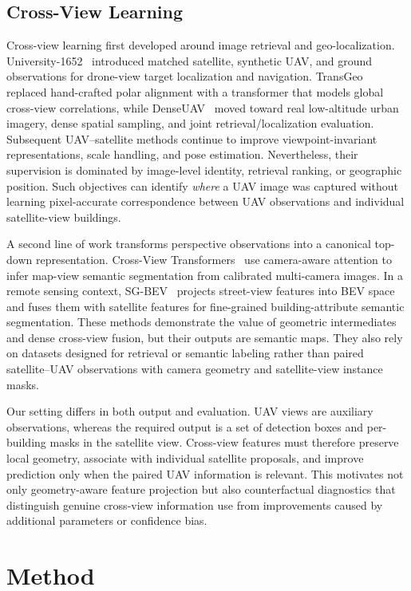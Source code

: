 \documentclass[letterpaper,journal]{IEEEtran}
\begin{document}
\subsection{Cross-View Learning}
Cross-view learning first developed around image retrieval and geo-localization. University-1652~\cite{ref_university} introduced matched satellite, synthetic UAV, and ground observations for drone-view target localization and navigation. TransGeo~\cite{ref_transgeo} replaced hand-crafted polar alignment with a transformer that models global cross-view correlations, while DenseUAV~\cite{ref_denseuav} moved toward real low-altitude urban imagery, dense spatial sampling, and joint retrieval/localization evaluation. Subsequent UAV--satellite methods continue to improve viewpoint-invariant representations, scale handling, and pose estimation. Nevertheless, their supervision is dominated by image-level identity, retrieval ranking, or geographic position. Such objectives can identify \emph{where} a UAV image was captured without learning pixel-accurate correspondence between UAV observations and individual satellite-view buildings.

A second line of work transforms perspective observations into a canonical top-down representation. Cross-View Transformers~\cite{ref_cvt} use camera-aware attention to infer map-view semantic segmentation from calibrated multi-camera images. In a remote sensing context, SG-BEV~\cite{ref_sgbeyv} projects street-view features into BEV space and fuses them with satellite features for fine-grained building-attribute semantic segmentation. These methods demonstrate the value of geometric intermediates and dense cross-view fusion, but their outputs are semantic maps. They also rely on datasets designed for retrieval or semantic labeling rather than paired satellite--UAV observations with camera geometry and satellite-view instance masks.

Our setting differs in both output and evaluation. UAV views are auxiliary observations, whereas the required output is a set of detection boxes and per-building masks in the satellite view. Cross-view features must therefore preserve local geometry, associate with individual satellite proposals, and improve prediction only when the paired UAV information is relevant. This motivates not only geometry-aware feature projection but also counterfactual diagnostics that distinguish genuine cross-view information use from improvements caused by additional parameters or confidence bias.

\section{Method}
\label{sec:method}
\end{document}
